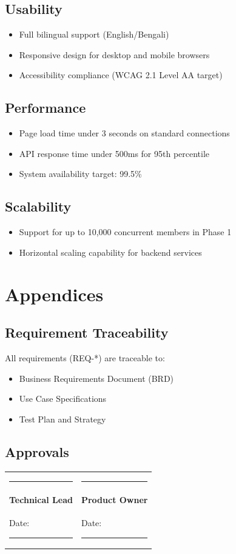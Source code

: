 \documentclass[11pt,a4paper]{article}
\begin{document}
\subsection{Usability}
\begin{itemize}
    \item Full bilingual support (English/Bengali)
    \item Responsive design for desktop and mobile browsers
    \item Accessibility compliance (WCAG 2.1 Level AA target)
\end{itemize}

\subsection{Performance}
\begin{itemize}
    \item Page load time under 3 seconds on standard connections
    \item API response time under 500ms for 95th percentile
    \item System availability target: 99.5\%
\end{itemize}

\subsection{Scalability}
\begin{itemize}
    \item Support for up to 10,000 concurrent members in Phase 1
    \item Horizontal scaling capability for backend services
\end{itemize}

\section{Appendices}

\subsection{Requirement Traceability}
All requirements (REQ-*) are traceable to:
\begin{itemize}
    \item Business Requirements Document (BRD)
    \item Use Case Specifications
    \item Test Plan and Strategy
\end{itemize}

\subsection{Approvals}

\vspace{1cm}

\begin{tabular}{@{}p{6cm}p{6cm}@{}}
\rule{5cm}{0.4pt} & \rule{5cm}{0.4pt} \\
\textbf{Technical Lead} & \textbf{Product Owner} \\
Date: \rule{3cm}{0.4pt} & Date: \rule{3cm}{0.4pt} \\
\end{tabular}
\end{document}
